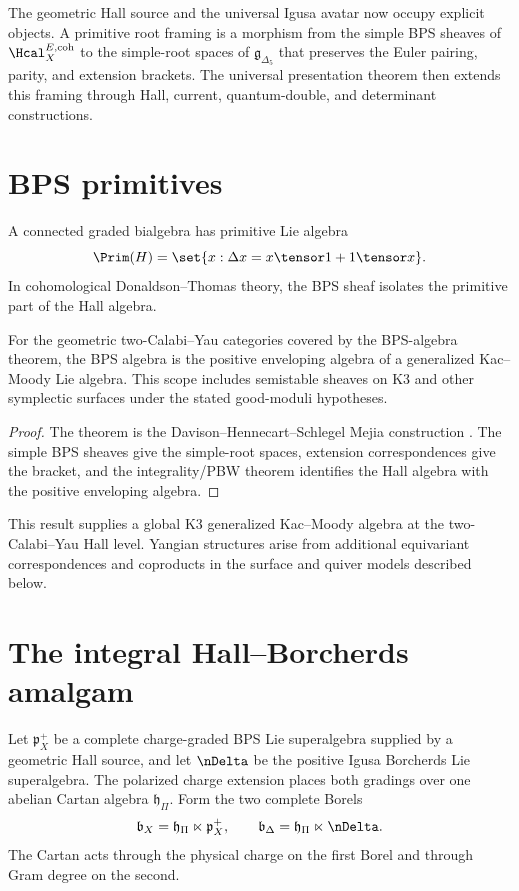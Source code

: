 The geometric Hall source and the universal Igusa avatar now occupy explicit objects.  A primitive root framing is a morphism from the simple BPS sheaves of $\Hcal_X^{E,\mathrm{coh}}$ to the simple-root spaces of $\mathfrak g_{\Delta_5}$ that preserves the Euler pairing, parity, and extension brackets.  The universal presentation theorem then extends this framing through Hall, current, quantum-double, and determinant constructions.

\chapter{BPS primitives}
A connected graded bialgebra has primitive Lie algebra
\[
 \Prim(H)=\set{x:\Delta x=x\tensor1+1\tensor x}.
\]
In cohomological Donaldson--Thomas theory, the BPS sheaf isolates the primitive part of the Hall algebra.

\begin{theorem}
For the geometric two-Calabi--Yau categories covered by the BPS-algebra theorem, the BPS algebra is the positive enveloping algebra of a generalized Kac--Moody Lie algebra. This scope includes semistable sheaves on K3 and other symplectic surfaces under the stated good-moduli hypotheses.
\end{theorem}
\begin{proof}
The theorem is the Davison--Hennecart--Schlegel Mejia construction \cite{DHS}. The simple BPS sheaves give the simple-root spaces, extension correspondences give the bracket, and the integrality/PBW theorem identifies the Hall algebra with the positive enveloping algebra.
\end{proof}

This result supplies a global K3 generalized Kac--Moody algebra at the two-Calabi--Yau Hall level. Yangian structures arise from additional equivariant correspondences and coproducts in the surface and quiver models described below.

\chapter{The integral Hall--Borcherds amalgam}
Let $\mathfrak p_X^+$ be a complete charge-graded BPS Lie superalgebra supplied by a geometric Hall source, and let $\nDelta$ be the positive Igusa Borcherds Lie superalgebra.  The polarized charge extension places both gradings over one abelian Cartan algebra $\mathfrak h_\Pi$.  Form the two complete Borels
\[
 \mathfrak b_X=\mathfrak h_\Pi\ltimes\mathfrak p_X^+,
 \qquad
 \mathfrak b_\Delta=\mathfrak h_\Pi\ltimes\nDelta.
\]
The Cartan acts through the physical charge on the first Borel and through Gram degree on the second.


